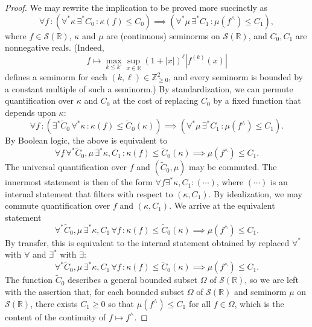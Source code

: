 \begin{proof}
  We may rewrite the implication to be proved more succinctly as
  \begin{equation*}
    \forall f \,
    :  (
    \forall^* \kappa \, \exists^* C_0 \, :  \kappa(f) \leq C_0
    ) \implies
    (
    \forall^* \mu \, \exists^* C_1 \,  : \mu(f^\wedge) \leq C_1
    ),
  \end{equation*}
  where $f \in \mathcal{S}(\mathbb{R})$, $\kappa$ and $\mu$ are (continuous) seminorms on $\mathcal{S}(\mathbb{R})$, and $C_0, C_1$ are nonnegative reals.  (Indeed,
  \begin{equation*}
    f \mapsto \max_{k \leq k'} \sup_{x \in \mathbb{R}} (1 + |x|)^{\ell} |f^{(k)}(x)|
  \end{equation*}
  defines a seminorm for each $(k,\ell) \in \mathbb{Z}_{\geq 0}^2$, and every seminorm is bounded by a constant multiple of such a seminorm.)  By standardization, we can permute quantification over $\kappa$ and $C_0$ at the cost of replacing $C_0$ by a fixed function that depends upon $\kappa$:
  \begin{equation*}
    \forall f \,
    :  (
    \exists^* \tilde{C}_0 \, \forall^* \kappa \, : \kappa(f) \leq \tilde{C}_0(\kappa)
    ) \implies
    (
    \forall^* \mu \, \exists^* C_1 \, :  \mu(f^\wedge) \leq C_1
    ).
  \end{equation*}
  By Boolean logic, the above is equivalent to
  \begin{equation*}
    \forall f \, \forall^* \tilde{C}_0, \mu \, \exists^* \kappa, C_1 \,
    : \kappa(f) \leq \tilde{C}_0(\kappa)
    \implies \mu(f^\wedge) \leq C_1.
  \end{equation*}
  The universal quantification over $f$ and $(\tilde{C}_0, \mu)$ may be commuted.  The innermost statement is then of the form $\forall f \exists^* \kappa, C_1 : (\dotsb)$, where $(\dotsb)$ is an internal statement that filters with respect to $(\kappa,C_1)$.  By idealization, we may commute quantification over $f$ and $(\kappa,C_1)$.  We arrive at the equivalent statement
  \begin{equation*}
    \forall^* \tilde{C}_0, \mu \, \exists^* \kappa, C_1 \,
    \forall f \,
    : \kappa(f) \leq \tilde{C}_0(\kappa)
    \implies \mu(f^\wedge) \leq C_1.
  \end{equation*}
  By transfer, this is equivalent to the internal statement obtained by replaced $\forall^*$ with $\forall$ and $\exists^*$ with $\exists$:
  \begin{equation*}
    \forall^* \tilde{C}_0, \mu \, \exists^* \kappa, C_1 \,
    \forall f \,
    : \kappa(f) \leq \tilde{C}_0(\kappa)
    \implies \mu(f^\wedge) \leq C_1.
  \end{equation*}
  The function $\tilde{C}_0$ describes a general bounded subset $\Omega$ of $\mathcal{S}(\mathbb{R})$, so we are left with the assertion that, for each bounded subset $\Omega$ of $\mathcal{S}(\mathbb{R})$ and seminorm $\mu$ on $\mathcal{S}(\mathbb{R})$, there exists $C_1 \geq 0$ so that $\mu(f^\wedge) \leq C_1$ for all $f \in \Omega$, which is the content of the continuity of $f \mapsto f^\wedge$.
\end{proof}



